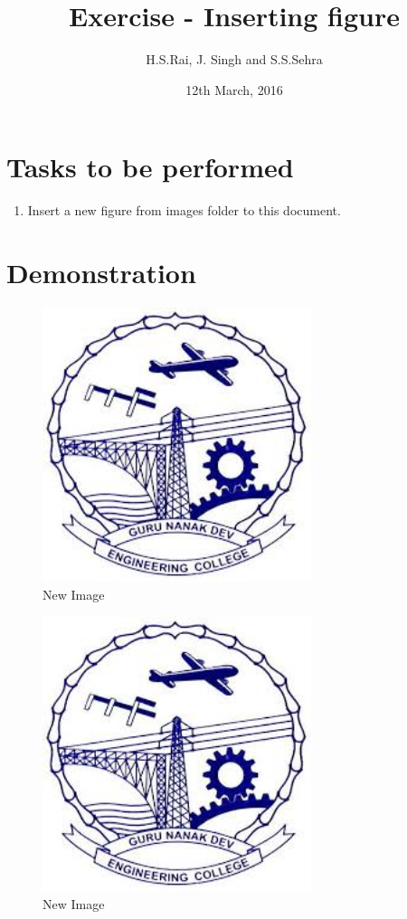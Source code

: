 \documentclass{article}
\title{Exercise - Inserting figure}
\author{H.S.Rai, J. Singh and S.S.Sehra}
\date{12th March, 2016}
\begin{document}
\maketitle	
\section*{Tasks to be performed}
\begin{enumerate}	
\item Insert a new figure from images folder to this document.
\end{enumerate}
\section*{Demonstration}
\begin{figure}
\centering
\includegraphics[width=0.7\textwidth]{../../images/gnelogo}
\caption{New Image}
\label{fig:gnelogo}
\end{figure}
\begin{figure}
\centering
\includegraphics[width=0.7\textwidth]{../../images/gnelogo}
\caption{New Image}
\label{fig:gnelogo1}
\end{figure}
\end{document}
